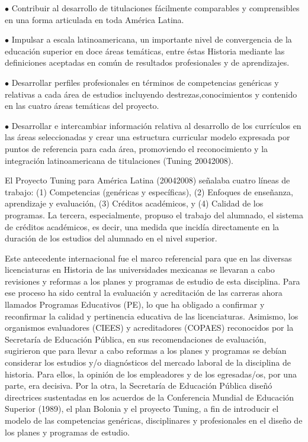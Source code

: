 \begin{Obs}
\begin{sloppypar}
\item[$\bullet$] Contribuir al desarrollo de titulaciones fácilmente comparables y
comprensibles en una forma articulada en toda América Latina.
\end{sloppypar}

\item[$\bullet$] Impulsar a escala latinoamericana, un importante nivel de convergencia de la
educación superior en doce áreas temáticas, \textemdash{}entre éstas Historia\textemdash{}
mediante las definiciones aceptadas en común de resultados profesionales y
de aprendizajes.
\item[$\bullet$] Desarrollar perfiles profesionales en términos de competencias genéricas y
relativas a cada área de estudios incluyendo destrezas,\linebreak conocimientos y
contenido en las cuatro áreas temáticas del proyecto.
\item[$\bullet$] Desarrollar e intercambiar información relativa al desarrollo de los
currículos en las áreas seleccionadas y crear una estructura curricular
modelo expresada por puntos de referencia para cada área, promoviendo el
reconocimiento y la integración latinoamericana de titulaciones (Tuning
2004\textendash{}2008).
\end{Obs}

El Proyecto Tuning para América Latina (2004\textendash{}2008) señalaba cuatro líneas de
trabajo: (1) Competencias (genéricas y específicas), (2) Enfoques de
enseñanza, aprendizaje y evaluación, (3) Créditos académicos, y (4) Calidad
de los programas. La tercera, especialmente, propuso el trabajo del alumnado,
el sistema de créditos académicos, es decir, una medida que incidía directamente en la duración de los estudios del alumnado en el nivel superior.

Este antecedente internacional fue el marco referencial para que en las
diversas licenciaturas en Historia de las universidades mexicanas se
llevaran a cabo revisiones y reformas a los planes y programas de estudio
de esta disciplina. Para ese proceso ha sido central la evaluación y
acreditación de las carreras \textemdash{}ahora llamados Programas Educativos (PE)\textemdash{}, 
lo que ha obligado a confirmar y reconfirmar la calidad y pertinencia educativa de las licenciaturas. Asimismo, los organismos evaluadores (CIEES) y acreditadores
(COPAES) reconocidos por la Secretaría de Educación Pública, en sus
recomendaciones de evaluación, sugirieron que para llevar a cabo reformas a
los planes y programas se debían considerar los estudios y\slash{}o diagnósticos
del mercado laboral de la disciplina de historia. Para ellos,  la
opinión de los empleadores y de los egresadas\slash{}os, por una parte, era decisiva. Por la otra, la Secretaría de Educación Pública diseñó directrices sustentadas en los acuerdos de la Conferencia Mundial de Educación Superior (1989), el plan 
Bolonia y el proyecto Tuning, a fin de introducir el modelo 
de las competencias genéricas, disciplinares y profesionales en el diseño de los planes y programas de estudio.

